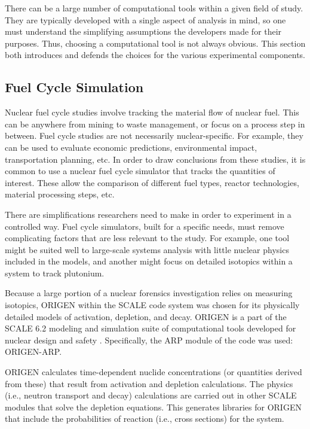 There can be a large number of computational tools within a given field of
study.  They are typically developed with a single aspect of analysis in mind,
so one must understand the simplifying assumptions the developers made for
their purposes. Thus, choosing a computational tool is not always obvious. This
section both introduces and defends the choices for the various experimental
components.

\subsection{Fuel Cycle Simulation}

Nuclear fuel cycle studies involve tracking the material flow of nuclear fuel.
This can be anywhere from mining to waste management, or focus on a process
step in between. Fuel cycle studies are not necessarily nuclear-specific. For
example, they can be used to evaluate economic predictions, environmental
impact, transportation planning, etc.  In order to draw conclusions from these
studies, it is common to use a nuclear fuel cycle simulator that tracks the
quantities of interest. These allow the comparison of different fuel types,
reactor technologies, material processing steps, etc. 

There are simplifications researchers need to make in order to experiment in a
controlled way. Fuel cycle simulators, built for a specific needs, must remove
complicating factors that are less relevant to the study.  For example, one
tool might be suited well to large-scale systems analysis with little nuclear
physics included in the models, and another might focus on detailed isotopics
within a system to track plutonium.

Because a large portion of a nuclear forensics investigation relies on
measuring isotopics, \gls{ORIGEN} \cite{origen} within the \gls{SCALE} code
system was chosen for its physically detailed models of activation, depletion,
and decay.  \gls{ORIGEN} is a part of the \gls{SCALE} 6.2 modeling and
simulation suite of computational tools developed for nuclear design and safety
\cite{scale}. Specifically, the ARP module of the code was used:
\gls{ORIGEN-ARP}.

\gls{ORIGEN} calculates time-dependent nuclide concentrations (or quantities
derived from these) that result from activation and depletion calculations. The
physics (i.e., neutron transport and decay) calculations are carried out in
other \gls{SCALE} modules that solve the depletion equations.  This generates
libraries for \gls{ORIGEN} that include the probabilities of reaction (i.e.,
cross sections) for the system.

